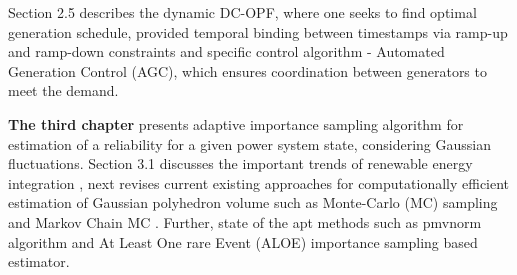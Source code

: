 Section 2.5 describes the dynamic DC-OPF, where one seeks to find optimal generation schedule, provided temporal binding between timestamps via ramp-up and ramp-down constraints and specific control algorithm - Automated Generation Control (AGC), which ensures coordination between generators to meet the demand. 

\textbf{The third chapter} presents adaptive importance sampling algorithm for estimation of a reliability for a given power system state, considering Gaussian fluctuations. Section 3.1 discusses the important trends of renewable energy integration \cite{harjanne2019abandoning, golden2003senate}, next revises current existing approaches for computationally efficient estimation of Gaussian polyhedron volume such as Monte-Carlo (MC) sampling and Markov Chain MC \cite{su2005probabilistic,vittal2009steady,chen2008probabilistic, montecarlofeasibility}. Further, state of the apt methods such as pmvnorm algorithm \cite{genz2020package} and At Least One rare Event (ALOE) \cite{owen2019importance} importance sampling based estimator.

